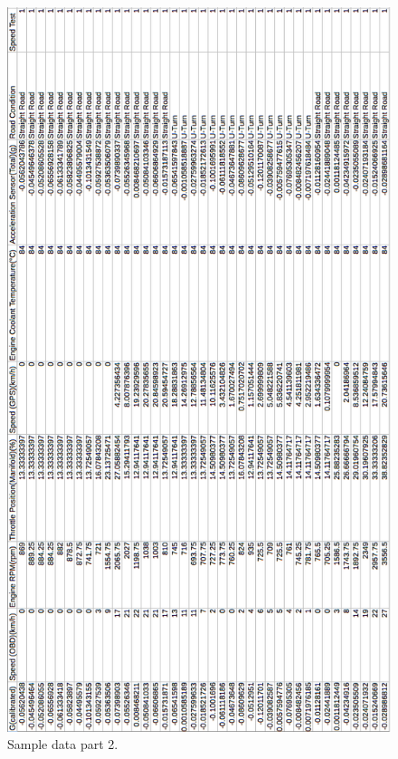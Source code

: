 \begin{figure}[hbt!]\centering
\includegraphics[scale=0.6]{image/sample2}
\caption{Sample data part 2.}
\end{figure}